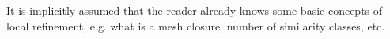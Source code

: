 \documentclass[a4paper,12pt]{amsart}
\numberwithin{equation}{section}
\begin{document}
It is implicitly assumed that the reader already knows some basic concepts of local refinement, e.g. what is a mesh closure, number of similarity classes, etc. 

%
%
%
%
\end{document}
